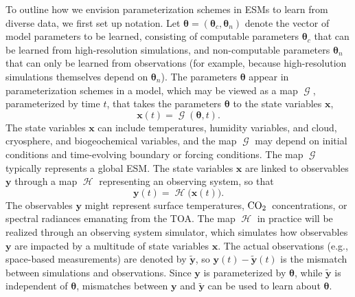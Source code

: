 \documentclass[draft]{agujournal}
\newcommand{\coo}{${\rm {CO}_{2}}$}
\renewcommand{\vec}[1]{\boldsymbol{{#1}}}
\newcommand{\cH}{\mathop{\mathcal{H}}}
\newcommand{\cG}{\mathop{\mathcal{G}}}
\begin{document}
To outline how we envision parameterization schemes in ESMs to learn from diverse data, we first set up notation. Let $\vec{\theta}=(\vec{\theta}_c, \vec{\theta}_n)$ denote the vector of model parameters to be learned, consisting of computable parameters $\vec{\theta}_c$ that can be learned from high-resolution simulations, and non-computable parameters $\vec{\theta}_n$ that can only be learned from observations (for example, because high-resolution simulations themselves depend on $\vec{\theta}_n$). The parameters $\vec{\theta}$ appear in parameterization schemes in a model, which may be viewed as a map $\cG$, parameterized by time $t$, that takes the parameters $\vec{\theta}$ to the state variables $\vec{x}$, 
\begin{equation}
\vec{x}(t) = \cG(\vec{\theta}, t).
\end{equation}
The state variables $\vec{x}$ can include temperatures, humidity variables, and cloud, cryosphere, and biogeochemical variables, and the map $\cG$ may depend on initial conditions and time-evolving boundary or forcing conditions. The map $\cG$ typically represents a global ESM. The state variables $\vec{x}$ are linked to observables $\vec{y}$ through a map $\cH$ representing an observing system, so that 
\begin{equation}
\vec{y}(t)=\cH\bigl(\vec{x}(t)\bigr).
\end{equation}
The observables $\vec{y}$ might represent surface temperatures, \coo\ concentrations, or spectral radiances emanating from the TOA. The map $\cH$ in practice will be realized through an observing system simulator, which simulates how observables $\vec{y}$ are impacted by a multitude of state variables $\vec{x}$. The actual observations (e.g., space-based measurements) are denoted by $\vec{\tilde y}$, so $\vec{y}(t) - \vec{\tilde y}(t)$ is the mismatch between simulations and observations. Since $\vec{y}$ is parameterized by $\vec{\theta}$, while $\vec{\tilde y}$ is independent of $\vec{\theta}$, mismatches between $\vec{y}$ and  $\vec{\tilde y}$ can be used to learn about $\vec{\theta}$. 
\end{document}
